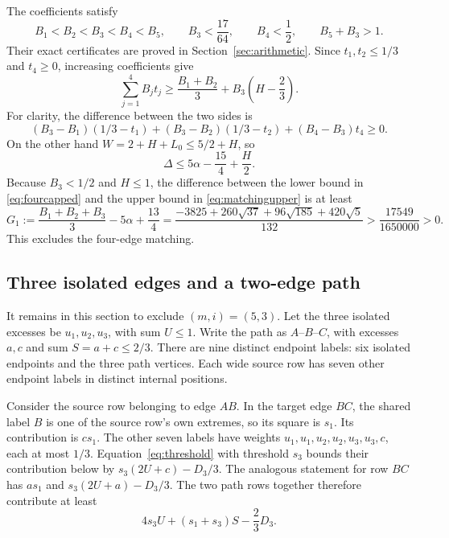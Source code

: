 \documentclass[11pt]{article}
\theoremstyle{definition}
\theoremstyle{remark}
\begin{document}
The coefficients satisfy
\begin{equation}\label{eq:Bsigns}
 B_1<B_2<B_3<B_4<B_5,\qquad B_3<\frac{17}{64},
 \qquad B_4<\frac12,
 \qquad B_5+B_3>1.
\end{equation}
Their exact certificates are proved in Section~\ref{sec:arithmetic}.
Since $t_1,t_2\leq1/3$ and $t_4\geq0$, increasing coefficients give
\begin{equation}\label{eq:fourcapped}
 \sum_{j=1}^4B_jt_j
 \geq\frac{B_1+B_2}{3}+B_3\left(H-\frac23\right).
\end{equation}
For clarity, the difference between the two sides is
\[
 (B_3-B_1)(1/3-t_1)+(B_3-B_2)(1/3-t_2)
      +(B_4-B_3)t_4\geq0.
\]
On the other hand $W=2+H+L_0\leq5/2+H$, so
\begin{equation}\label{eq:matchingupper}
 \Delta\leq5\alpha-\frac{15}{4}+\frac H2.
\end{equation}
Because $B_3<1/2$ and $H\leq1$, the difference between the lower bound
in \eqref{eq:fourcapped} and the upper bound in
\eqref{eq:matchingupper} is at least
\begin{equation}\label{eq:G1}
 G_1:=\frac{B_1+B_2+B_3}{3}-5\alpha+\frac{13}{4}
 =\frac{-3825+260\sqrt{37}+96\sqrt{185}+420\sqrt5}{132}
 >\frac{17549}{1650000}>0.
\end{equation}
This excludes the four-edge matching.

\subsection{Three isolated edges and a two-edge path}\label{subsec:path}

It remains in this section to exclude $(m,i)=(5,3)$. Let the three
isolated excesses be $u_1,u_2,u_3$, with sum $U\leq1$. Write the
path as $A$--$B$--$C$, with excesses $a,c$ and sum $S=a+c\leq2/3$.
There are nine distinct endpoint labels: six isolated endpoints and
the three path vertices. Each wide source row has seven other endpoint
labels in distinct internal positions.

Consider the source row belonging to edge $AB$. In the target edge
$BC$, the shared label $B$ is one of the source row's own extremes,
so its square is $s_1$. Its contribution is $cs_1$. The other seven
labels have weights $u_1,u_1,u_2,u_2,u_3,u_3,c$, each at most $1/3$.
Equation~\eqref{eq:threshold} with threshold $s_3$ bounds their
contribution below by $s_3(2U+c)-D_3/3$. The analogous statement for
row $BC$ has $as_1$ and $s_3(2U+a)-D_3/3$. The two path rows
together therefore contribute at least
\begin{equation}\label{eq:pathrows}
 4s_3U+(s_1+s_3)S-\frac23D_3.
\end{equation}
\end{document}
